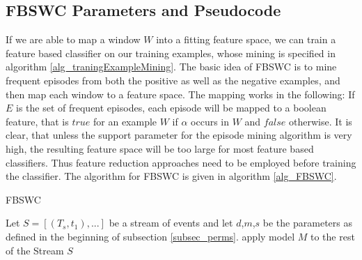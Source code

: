 \subsection{FBSWC Parameters and Pseudocode}

If we are able to map a window $W$ into a fitting feature space, we can train a feature based classifier on our training examples, whose mining is specified in algorithm \ref{alg_traningExampleMining}. The basic idea of FBSWC is to mine frequent episodes from both the positive as well as the negative examples, and then map each window to a feature space. The mapping works in the following: If $E$ is the set of frequent episodes, each episode will be mapped to a boolean feature, that is $true$ for an example $W$ if $\alpha$ occurs in $W$ and $false$ otherwise. It is clear, that unless the support parameter for the episode mining algorithm is very high, the resulting feature space will be too large for most feature based classifiers. Thus feature reduction approaches need to be employed before training the classifier. The algorithm for FBSWC is given in algorithm \ref{alg_FBSWC}.

\begin{algorithm}[H]
  \caption{FBSWC
    \label{alg_FBSWC}}
  \begin{algorithmic}[1]
    \Statex
    \Require Let $S=[(T_s,t_1),...]$ be a stream of events and let $d$,$m$,$s$ be the parameters as defined in the beginning of subsection \ref{subsec_perms}.
       
      	\EndFor
      	 
      \EndFor
      \State apply model $M$ to the rest of the Stream $S$
    \EndFunction
  \end{algorithmic}
\end{algorithm}


